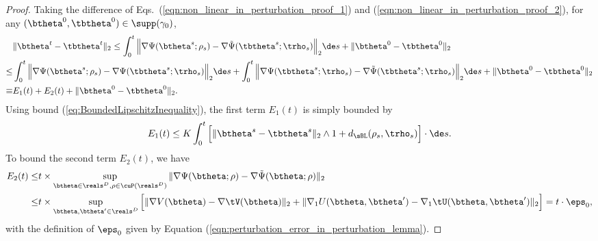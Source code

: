 \documentclass[11pt]{article}
\begin{document}
\begin{proof}
Taking the difference of Eqs.~(\ref{eqn:non_linear_in_perturbation_proof_1}) and (\ref{eqn:non_linear_in_perturbation_proof_2}), for any $(\btheta^0, \tbtheta^0) \in \supp(\gamma_0)$, 
\begin{equation}\label{eqn:Bound_difference_theta_in_perturbation_proof}
\begin{aligned}
&\| \btheta^t - \tbtheta^t \|_2  \le \int_0^t \Big \| \nabla \Psi(\btheta^s; \rho_s) -  \nabla \tilde \Psi(\tbtheta^s; \trho_s) \Big\|_2 \de s + \| \btheta^0 - \tbtheta^0 \|_2\\
\le& \int_0^t  \Big \| \nabla \Psi(\btheta^s; \rho_s) -  \nabla \Psi(\tbtheta^s; \trho_s) \Big\|_2 \de s + \int_0^t \Big \| \nabla \Psi(\tbtheta^s; \trho_s) -  \nabla \tilde \Psi(\tbtheta^s; \trho_s) \Big\|_2 \de s+ \| \btheta^0 - \tbtheta^0 \|_2\\
\equiv & E_1(t) + E_2(t) + \| \btheta^0 - \tbtheta^0 \|_2.
\end{aligned}
\end{equation}
Using bound (\ref{eq:BoundedLipschitzInequality}), the first term $E_1(t)$ is simply bounded by
\begin{align}
E_1(t) \le  K  \int_0^t \Big [ \|\btheta^s - \tbtheta^s \|_2 \wedge 1 + d_{\sBL}(\rho_s, \trho_s) \Big] \cdot  \de s .\label{eq:Bound_E1_in_perturbation_proof}
\end{align}
To bound the second term $E_2(t)$, we have
\begin{align}
E_2(t) \le&t \times  \sup_{\btheta \in \reals^D, \rho \in \cuP(\reals^D)} \| \nabla \Psi(\btheta; \rho) - \nabla \tilde \Psi(\btheta; \rho) \|_2 \nonumber\\
 \le& t \times \sup_{\btheta, \btheta' \in \reals^D} \Big[ \| \nabla V(\btheta) - \nabla \tV(\btheta) \|_2 + \| \nabla_1 U(\btheta, \btheta') - \nabla_1 \tU(\btheta, \btheta') \|_2 \Big] = t \cdot \eps_0, \label{eq:Bound_E2_in_perturbation_proof}
\end{align}
with the definition of $\eps_0$ given by Equation (\ref{eqn:perturbation_error_in_perturbation_lemma}).


\end{proof}
\end{document}
